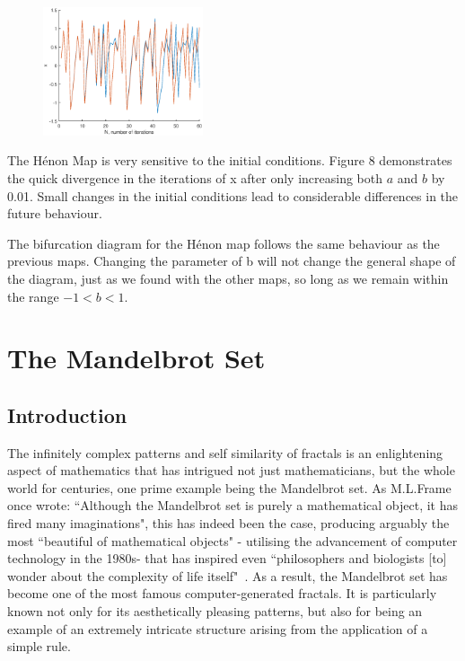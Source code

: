 \documentclass[a4paper]{article}
\begin{document}
\pagebreak

\begin{figure} %
    \centering
    \includegraphics[width=0.42\textwidth]{henonchangingconditions}
    \caption{}
\end{figure}

The H{\'e}non Map is very sensitive to the initial conditions. Figure 8 demonstrates the quick divergence in the iterations of x after only increasing both $ a $ and $ b $ by 0.01. Small changes in the initial conditions lead to considerable differences in the future behaviour.

The bifurcation diagram for the H{\'e}non map follows the same behaviour as the previous maps. Changing the parameter of b will not change the general shape of the diagram, just as we found with the other maps, so long as we remain within the range $-1<b<1$.
\pagebreak

\section{The Mandelbrot Set}
\subsection{Introduction}
The infinitely complex patterns and self similarity of fractals is an enlightening aspect of mathematics that has intrigued not just mathematicians, but the whole world for centuries, one prime example being the Mandelbrot set. As M.L.Frame once wrote: ``Although the Mandelbrot set is purely a mathematical object, it has fired many imaginations", this has indeed been the case, producing arguably the most ``beautiful of mathematical objects" - utilising the advancement of computer technology in the 1980s- that has inspired even ``philosophers and biologists [to] wonder about the complexity of life itself"~\cite{FractalsGraphics}. As a result, the Mandelbrot set has become one of the most famous computer-generated fractals. It is particularly known not only for its aesthetically pleasing patterns, but also for being an example of an extremely intricate structure arising from the application of a simple rule. 
\end{document}
